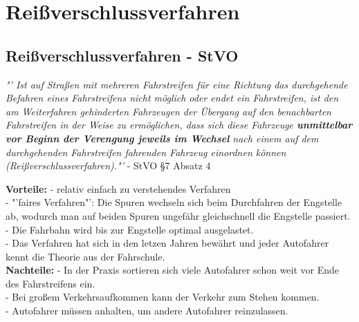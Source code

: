 \chapter{Reißverschlussverfahren}
\section{Reißverschlussverfahren - StVO}
\begin{center}
	\textit{"' Ist auf Straßen mit mehreren Fahrstreifen für eine Richtung das durchgehende Befahren eines Fahrstreifens nicht möglich oder endet ein Fahrstreifen, ist den am Weiterfahren gehinderten Fahrzeugen der Übergang auf den benachbarten Fahrstreifen in der Weise zu ermöglichen, dass sich diese Fahrzeuge \textbf{unmittelbar vor Beginn der Verengung jeweils im Wechsel} nach einem auf dem durchgehenden Fahrstreifen fahrenden Fahrzeug einordnen können (Reißverschlussverfahren)."'} - StVO \S 7 Absatz 4
\end{center}
\textbf{Vorteile:} - relativ einfach zu verstehendes Verfahren\\
- "'faires Verfahren"': Die Spuren wechseln sich beim Durchfahren der Engstelle ab, wodurch man auf beiden Spuren ungefähr gleichschnell die Engstelle passiert.\\
- Die Fahrbahn wird bis zur Engstelle optimal ausgelastet.\\
- Das Verfahren hat sich in den letzen Jahren bewährt und jeder Autofahrer kennt die Theorie aus der Fahrschule.\\
\textbf{Nachteile:} - In der Praxis sortieren sich viele Autofahrer schon weit vor Ende des Fahrstreifens ein.\\
- Bei großem Verkehrsaufkommen kann der Verkehr zum Stehen kommen.\\
- Autofahrer müssen anhalten, um andere Autofahrer reinzulassen.\\

